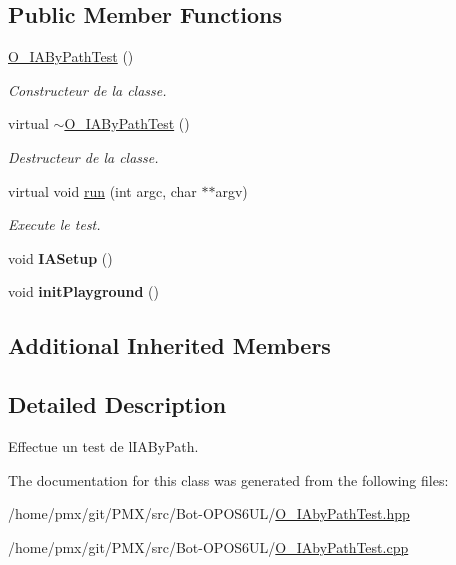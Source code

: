 \subsection*{Public Member Functions}
\begin{DoxyCompactItemize}
\item 
\mbox{\label{classO__IAByPathTest_ad4e215f7103a01bd046689a62c49a546}} 
\hyperlink{classO__IAByPathTest_ad4e215f7103a01bd046689a62c49a546}{O\+\_\+\+I\+A\+By\+Path\+Test} ()
\begin{DoxyCompactList}\small\item\em Constructeur de la classe. \end{DoxyCompactList}\item 
\mbox{\label{classO__IAByPathTest_adb09c96035e31369adffb852c6cda8df}} 
virtual \hyperlink{classO__IAByPathTest_adb09c96035e31369adffb852c6cda8df}{$\sim$\+O\+\_\+\+I\+A\+By\+Path\+Test} ()
\begin{DoxyCompactList}\small\item\em Destructeur de la classe. \end{DoxyCompactList}\item 
\mbox{\label{classO__IAByPathTest_a3f57f585ff1382a52bf7f79a28d43629}} 
virtual void \hyperlink{classO__IAByPathTest_a3f57f585ff1382a52bf7f79a28d43629}{run} (int argc, char $\ast$$\ast$argv)
\begin{DoxyCompactList}\small\item\em Execute le test. \end{DoxyCompactList}\item 
\mbox{\label{classO__IAByPathTest_abedd21fde4835d641e6aa3f8e1c6581f}} 
void {\bfseries I\+A\+Setup} ()
\item 
\mbox{\label{classO__IAByPathTest_ad010b84a2684b7e16b75c98d6231e5ac}} 
void {\bfseries init\+Playground} ()
\end{DoxyCompactItemize}
\subsection*{Additional Inherited Members}


\subsection{Detailed Description}
Effectue un test de l\textquotesingle{}I\+A\+By\+Path. 

The documentation for this class was generated from the following files\+:\begin{DoxyCompactItemize}
\item 
/home/pmx/git/\+P\+M\+X/src/\+Bot-\/\+O\+P\+O\+S6\+U\+L/\hyperlink{O__IAbyPathTest_8hpp}{O\+\_\+\+I\+Aby\+Path\+Test.\+hpp}\item 
/home/pmx/git/\+P\+M\+X/src/\+Bot-\/\+O\+P\+O\+S6\+U\+L/\hyperlink{O__IAbyPathTest_8cpp}{O\+\_\+\+I\+Aby\+Path\+Test.\+cpp}\end{DoxyCompactItemize}
